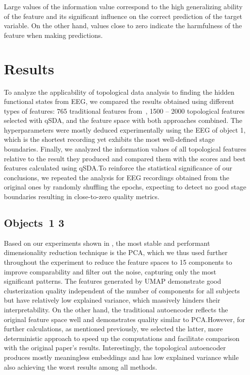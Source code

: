 \documentclass[10pt]{iopart}
\begin{document}
Large values of the information value correspond to the high generalizing ability of the feature and its significant influence on the correct prediction of the target variable. On the other hand, values close to zero indicate the harmfulness of the feature when making predictions.

\section{Results}

To analyze the applicability of topological data analysis to finding the hidden functional states from EEG, we compared the results obtained using different types of features: 765 traditional features from~\cite{SDA}, 1500 -- 2000 topological features selected with qSDA, and the feature space with both approaches combined. The hyperparameters were mostly deduced experimentally using the EEG of object 1, which is the shortest recording yet exhibits the most well-defined stage boundaries. Finally, we analyzed the information values of all topological features relative to the result they produced and compared them with the scores and best features calculated using qSDA.\@ To reinforce the statistical significance of our conclusions, we repeated the analysis for EEG recordings obtained from the original ones by randomly shuffling the epochs, expecting to detect no good stage boundaries resulting in close-to-zero quality metrics.

\subsection{Objects~1 3}

Based on our experiments shown in , the most stable and performant dimensionality reduction technique is the PCA, which we thus used further throughout the experiment to reduce the feature spaces to 15 components  to improve comparability and filter out the noise, capturing only the most significant patterns. The features generated by UMAP demonstrate good clusterization quality independent of the number of components for all subjects but have relatively low explained variance, which massively hinders their interpretability. On the other hand, the traditional autoencoder reflects the original feature space well and demonstrates quality similar to PCA.\@ However, for further calculations, as mentioned previously, we selected the latter, more deterministic approach to speed up the computations and facilitate comparison with the original paper's results. Interestingly, the topological autoencoder produces mostly meaningless embeddings and has low explained variance while also achieving the worst results among all methods. 
\end{document}
